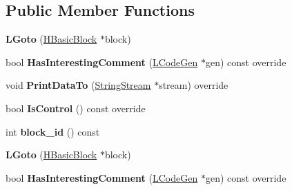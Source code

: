 \subsection*{Public Member Functions}
\begin{DoxyCompactItemize}
\item 
{\bfseries L\+Goto} (\hyperlink{classv8_1_1internal_1_1_h_basic_block}{H\+Basic\+Block} $\ast$block)\hypertarget{classv8_1_1internal_1_1_l_goto_a508956b700f4a115d2ae81e5c81b6d52}{}\label{classv8_1_1internal_1_1_l_goto_a508956b700f4a115d2ae81e5c81b6d52}

\item 
bool {\bfseries Has\+Interesting\+Comment} (\hyperlink{classv8_1_1internal_1_1_l_code_gen}{L\+Code\+Gen} $\ast$gen) const  override\hypertarget{classv8_1_1internal_1_1_l_goto_ae2dcadae50f2f182e7f9d772a170fe7b}{}\label{classv8_1_1internal_1_1_l_goto_ae2dcadae50f2f182e7f9d772a170fe7b}

\item 
void {\bfseries Print\+Data\+To} (\hyperlink{classv8_1_1internal_1_1_string_stream}{String\+Stream} $\ast$stream) override\hypertarget{classv8_1_1internal_1_1_l_goto_a42fa9224cfb4df48322ebdcf082ab6db}{}\label{classv8_1_1internal_1_1_l_goto_a42fa9224cfb4df48322ebdcf082ab6db}

\item 
bool {\bfseries Is\+Control} () const  override\hypertarget{classv8_1_1internal_1_1_l_goto_a4d45f583f9f81949e0ec9ab82d0a4dd1}{}\label{classv8_1_1internal_1_1_l_goto_a4d45f583f9f81949e0ec9ab82d0a4dd1}

\item 
int {\bfseries block\+\_\+id} () const \hypertarget{classv8_1_1internal_1_1_l_goto_a232c7b24fbe5cb48aa50908fe3d26626}{}\label{classv8_1_1internal_1_1_l_goto_a232c7b24fbe5cb48aa50908fe3d26626}

\item 
{\bfseries L\+Goto} (\hyperlink{classv8_1_1internal_1_1_h_basic_block}{H\+Basic\+Block} $\ast$block)\hypertarget{classv8_1_1internal_1_1_l_goto_a508956b700f4a115d2ae81e5c81b6d52}{}\label{classv8_1_1internal_1_1_l_goto_a508956b700f4a115d2ae81e5c81b6d52}

\item 
bool {\bfseries Has\+Interesting\+Comment} (\hyperlink{classv8_1_1internal_1_1_l_code_gen}{L\+Code\+Gen} $\ast$gen) const  override\hypertarget{classv8_1_1internal_1_1_l_goto_ae2dcadae50f2f182e7f9d772a170fe7b}{}\label{classv8_1_1internal_1_1_l_goto_ae2dcadae50f2f182e7f9d772a170fe7b}


\end{DoxyCompactItemize}
